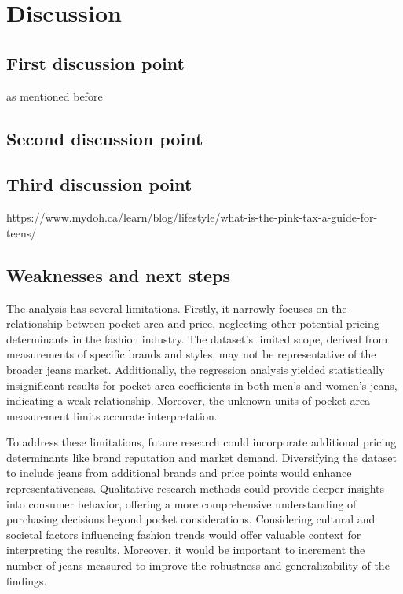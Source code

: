 \documentclass[
  letterpaper,
  DIV=11,
  numbers=noendperiod]{scrartcl}
\begin{document}
\hypertarget{discussion}{%
\section{Discussion}\label{discussion}}

\hypertarget{first-discussion-point}{%
\subsection{First discussion point}\label{first-discussion-point}}

as mentioned before

\hypertarget{second-discussion-point}{%
\subsection{Second discussion point}\label{second-discussion-point}}

\hypertarget{third-discussion-point}{%
\subsection{Third discussion point}\label{third-discussion-point}}

https://www.mydoh.ca/learn/blog/lifestyle/what-is-the-pink-tax-a-guide-for-teens/

\hypertarget{weaknesses-and-next-steps}{%
\subsection{Weaknesses and next steps}\label{weaknesses-and-next-steps}}

The analysis has several limitations. Firstly, it narrowly focuses on
the relationship between pocket area and price, neglecting other
potential pricing determinants in the fashion industry. The dataset's
limited scope, derived from measurements of specific brands and styles,
may not be representative of the broader jeans market. Additionally, the
regression analysis yielded statistically insignificant results for
pocket area coefficients in both men's and women's jeans, indicating a
weak relationship. Moreover, the unknown units of pocket area
measurement limits accurate interpretation.

To address these limitations, future research could incorporate
additional pricing determinants like brand reputation and market demand.
Diversifying the dataset to include jeans from additional brands and
price points would enhance representativeness. Qualitative research
methods could provide deeper insights into consumer behavior, offering a
more comprehensive understanding of purchasing decisions beyond pocket
considerations. Considering cultural and societal factors influencing
fashion trends would offer valuable context for interpreting the
results. Moreover, it would be important to increment the number of
jeans measured to improve the robustness and generalizability of the
findings.
\end{document}
